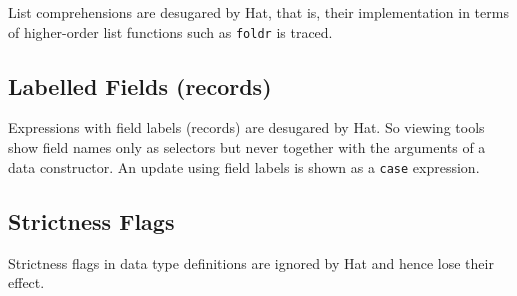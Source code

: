 \documentclass[12pt]{article}
\begin{document}
List comprehensions are desugared by Hat, that is, their implementation
in terms of higher-order list functions such as \texttt{foldr}
is traced.

\subsection{Labelled Fields (records)}

Expressions with field labels (records) are desugared by Hat. So
viewing tools show field names only as selectors but never together
with the arguments of a data constructor. An update using field labels
is shown as a \texttt{case} expression.

\subsection{Strictness Flags}

Strictness flags in data type definitions are ignored by Hat and
hence lose their effect.

\end{document}
